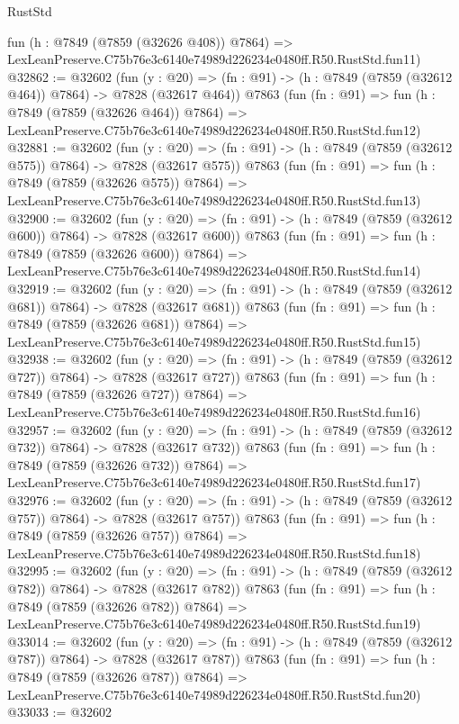 \begin{lexlean}{RustStd}
\begin{coremodule}
    fun (h : @7849 (@7859 (@32626 @408)) @7864) =>
    LexLeanPreserve.C75b76e3c6140e74989d226234e0480ff.R50.RustStd.fun11)
@32862 := @32602
    (fun (y : @20) => (fn : @91) -> (h : @7849 (@7859 (@32612 @464)) @7864) -> @7828 (@32617 @464))
    @7863
    (fun (fn : @91) =>
    fun (h : @7849 (@7859 (@32626 @464)) @7864) =>
    LexLeanPreserve.C75b76e3c6140e74989d226234e0480ff.R50.RustStd.fun12)
@32881 := @32602
    (fun (y : @20) => (fn : @91) -> (h : @7849 (@7859 (@32612 @575)) @7864) -> @7828 (@32617 @575))
    @7863
    (fun (fn : @91) =>
    fun (h : @7849 (@7859 (@32626 @575)) @7864) =>
    LexLeanPreserve.C75b76e3c6140e74989d226234e0480ff.R50.RustStd.fun13)
@32900 := @32602
    (fun (y : @20) => (fn : @91) -> (h : @7849 (@7859 (@32612 @600)) @7864) -> @7828 (@32617 @600))
    @7863
    (fun (fn : @91) =>
    fun (h : @7849 (@7859 (@32626 @600)) @7864) =>
    LexLeanPreserve.C75b76e3c6140e74989d226234e0480ff.R50.RustStd.fun14)
@32919 := @32602
    (fun (y : @20) => (fn : @91) -> (h : @7849 (@7859 (@32612 @681)) @7864) -> @7828 (@32617 @681))
    @7863
    (fun (fn : @91) =>
    fun (h : @7849 (@7859 (@32626 @681)) @7864) =>
    LexLeanPreserve.C75b76e3c6140e74989d226234e0480ff.R50.RustStd.fun15)
@32938 := @32602
    (fun (y : @20) => (fn : @91) -> (h : @7849 (@7859 (@32612 @727)) @7864) -> @7828 (@32617 @727))
    @7863
    (fun (fn : @91) =>
    fun (h : @7849 (@7859 (@32626 @727)) @7864) =>
    LexLeanPreserve.C75b76e3c6140e74989d226234e0480ff.R50.RustStd.fun16)
@32957 := @32602
    (fun (y : @20) => (fn : @91) -> (h : @7849 (@7859 (@32612 @732)) @7864) -> @7828 (@32617 @732))
    @7863
    (fun (fn : @91) =>
    fun (h : @7849 (@7859 (@32626 @732)) @7864) =>
    LexLeanPreserve.C75b76e3c6140e74989d226234e0480ff.R50.RustStd.fun17)
@32976 := @32602
    (fun (y : @20) => (fn : @91) -> (h : @7849 (@7859 (@32612 @757)) @7864) -> @7828 (@32617 @757))
    @7863
    (fun (fn : @91) =>
    fun (h : @7849 (@7859 (@32626 @757)) @7864) =>
    LexLeanPreserve.C75b76e3c6140e74989d226234e0480ff.R50.RustStd.fun18)
@32995 := @32602
    (fun (y : @20) => (fn : @91) -> (h : @7849 (@7859 (@32612 @782)) @7864) -> @7828 (@32617 @782))
    @7863
    (fun (fn : @91) =>
    fun (h : @7849 (@7859 (@32626 @782)) @7864) =>
    LexLeanPreserve.C75b76e3c6140e74989d226234e0480ff.R50.RustStd.fun19)
@33014 := @32602
    (fun (y : @20) => (fn : @91) -> (h : @7849 (@7859 (@32612 @787)) @7864) -> @7828 (@32617 @787))
    @7863
    (fun (fn : @91) =>
    fun (h : @7849 (@7859 (@32626 @787)) @7864) =>
    LexLeanPreserve.C75b76e3c6140e74989d226234e0480ff.R50.RustStd.fun20)
@33033 := @32602

\end{coremodule}
\end{lexlean}

